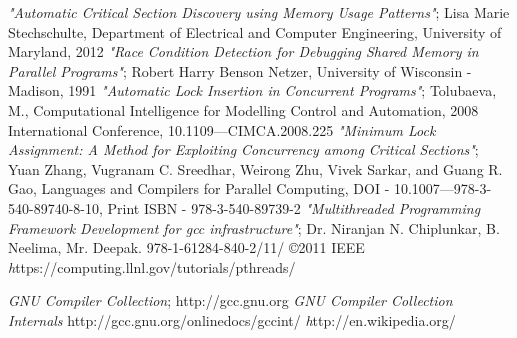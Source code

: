 \begin{thebibliography}{99}
\lhead{}\markboth{\bibname}{}
   

\bibitem\emph{"Automatic Critical Section Discovery using Memory Usage Patterns"}; Lisa Marie Stechschulte, Department of Electrical and Computer Engineering, University of Maryland, 2012
\bibitem\emph{"Race Condition Detection for Debugging Shared Memory in Parallel Programs"}; Robert Harry Benson Netzer, University of Wisconsin - Madison, 1991
\bibitem\emph{"Automatic Lock Insertion in Concurrent Programs"}; Tolubaeva, M., Computational Intelligence for Modelling Control and Automation, 2008 International Conference, 10.1109—CIMCA.2008.225
\bibitem\emph{"Minimum Lock Assignment: A Method for Exploiting Concurrency among Critical Sections"}; Yuan Zhang, Vugranam C. Sreedhar, Weirong Zhu, Vivek Sarkar, and Guang R. Gao, Languages and Compilers for Parallel Computing, DOI - 10.1007—978-3-540-89740-8-10, Print ISBN - 978-3-540-89739-2
\bibitem\emph{"Multithreaded Programming Framework Development for gcc infrastructure"}; Dr. Niranjan N. Chiplunkar, B. Neelima, Mr. Deepak. 978-1-61284-840-2/11/ ©2011 IEEE
\bibitem\emph https://computing.llnl.gov/tutorials/pthreads/

\bibitem\emph {GNU Compiler Collection}; http://gcc.gnu.org
\bibitem\emph {GNU Compiler Collection Internals} http://gcc.gnu.org/onlinedocs/gccint/
\bibitem\emph http://en.wikipedia.org/
     
\end{thebibliography}
